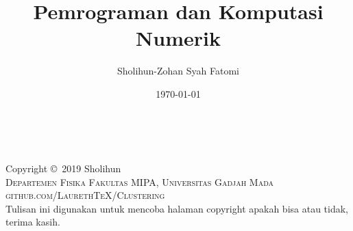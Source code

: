 \documentclass[a4paper,
12pt, %
fleqn, %
]{book}
\title{Pemrograman dan Komputasi Numerik}
\author{Sholihun-Zohan Syah Fatomi}
\date{\today}
\begin{document}







\newpage
~\vfill
\thispagestyle{empty}

\noindent Copyright \copyright\ 2019 Sholihun\\ %

\noindent \textsc{Departemen Fisika Fakultas MIPA, Universitas Gadjah Mada}\\

\noindent \textsc{github.com/LaurethTeX/Clustering}\\ %

\noindent Tulisan ini digunakan untuk mencoba halaman copyright apakah bisa atau tidak, terima kasih. \\ %
\end{document}
